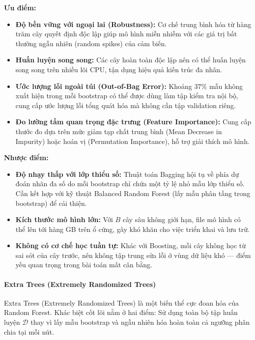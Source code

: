 \textbf{Ưu điểm:}
\begin{itemize}
    \item \textbf{Độ bền vững với ngoại lai (Robustness):} Cơ chế trung bình hóa từ hàng trăm cây quyết định độc lập giúp mô hình miễn nhiễm với các giá trị bất thường ngẫu nhiên (random spikes) của cảm biến.
    \item \textbf{Huấn luyện song song:} Các cây hoàn toàn độc lập nên có thể huấn luyện song song trên nhiều lõi CPU, tận dụng hiệu quả kiến trúc đa nhân.
    \item \textbf{Ước lượng lỗi ngoài túi (Out-of-Bag Error):} Khoảng $37\%$ mẫu không xuất hiện trong mỗi bootstrap có thể được dùng làm tập kiểm tra nội bộ, cung cấp ước lượng lỗi tổng quát hóa mà không cần tập validation riêng.
    \item \textbf{Đo lường tầm quan trọng đặc trưng (Feature Importance):} Cung cấp thước đo dựa trên mức giảm tạp chất trung bình (Mean Decrease in Impurity) hoặc hoán vị (Permutation Importance), hỗ trợ giải thích mô hình.
\end{itemize}

\textbf{Nhược điểm:}
\begin{itemize}
    \item \textbf{Độ nhạy thấp với lớp thiểu số:} Thuật toán Bagging hội tụ về phía dự đoán nhãn đa số do mỗi bootstrap chỉ chứa một tỷ lệ nhỏ mẫu lớp thiểu số. Cần kết hợp với kỹ thuật Balanced Random Forest (lấy mẫu phân tầng trong bootstrap) để cải thiện.
    \item \textbf{Kích thước mô hình lớn:} Với $B$ cây sâu không giới hạn, file mô hình có thể lên tới hàng GB trên ổ cứng, gây khó khăn cho việc triển khai và lưu trữ.
    \item \textbf{Không có cơ chế học tuần tự:} Khác với Boosting, mỗi cây không học từ sai sót của cây trước, nên không tập trung sửa lỗi ở vùng dữ liệu khó — điểm yếu quan trọng trong bài toán mất cân bằng.
\end{itemize}

\paragraph{Extra Trees (Extremely Randomized Trees)}\hspace{1cm}

Extra Trees (Extremely Randomized Trees) là một biến thể cực đoan hóa của Random Forest. Khác biệt cốt lõi nằm ở hai điểm: Sử dụng toàn bộ tập huấn luyện $\mathcal{D}$ thay vì lấy mẫu bootstrap và ngẫu nhiên hóa hoàn toàn cả ngưỡng phân chia tại mỗi nút.

